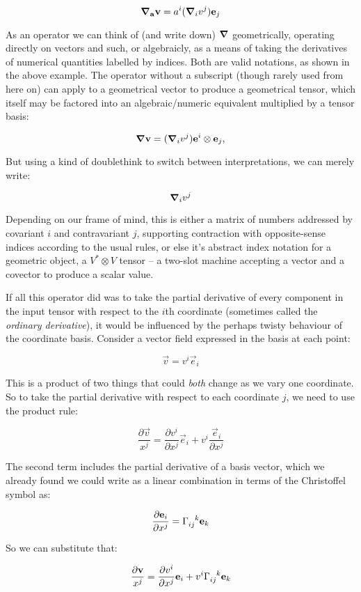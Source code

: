 $$
\grad_{\mathbf{a}} \mathbf{v} = a^i (\grad_i v^j) \mathbf{e}_j
$$

As an operator we can think of (and write down) $\grad$ geometrically, operating directly on vectors and such, or algebraicly, as a means of taking the derivatives of numerical quantities labelled by indices. Both are valid notations, as shown in the above example. The operator without a subscript (though rarely used from here on) can apply to a geometrical vector to produce a geometrical tensor, which itself may be factored into an algebraic/numeric equivalent multiplied by a tensor basis:

$$
\grad \mathbf{v} = (\grad_i v^j) \mathbf{e}^i \otimes \mathbf{e}_j,
$$

But using a kind of doublethink to switch between interpretations, we can merely write:

$$
\grad_i v^j
$$

Depending on our frame of mind, this is either a matrix of numbers addressed by covariant $i$ and contravariant $j$, supporting contraction with opposite-sense indices according to the usual rules, or else it's abstract index notation for a geometric object, a $V^* \otimes V$ tensor -- a two-slot machine accepting a vector and a covector to produce a scalar value.

If all this operator did was to take the partial derivative of every component in the input tensor with respect to the $i$th coordinate (sometimes called the \textit{ordinary derivative}), it would be influenced by the perhaps twisty behaviour of the coordinate basis. Consider a vector field expressed in the basis at each point:

$$
\vec{v} = v^i \vec{e}_i
$$

This is a product of two things that could \textit{both} change as we vary one coordinate. So to take the partial derivative with respect to each coordinate $j$, we need to use the product rule:

$$
\frac{\partial \vec{v}}{x^j} 
= \frac{\partial v^i}{\partial x^j} \vec{e}_i
+ v^i\frac{\vec{e}_i}{\partial x^j}
$$

The second term includes the partial derivative of a basis vector, which we already found we could write as a linear combination in terms of the Christoffel symbol as:

$$
\frac{\partial \vec{e}_i}{\partial x^j}
= \Gamma\indices{_i_j^k} \vec{e}_k
$$

So we can substitute that:

$$
\frac{\partial \vec{v}}{x^j} 
= \frac{\partial v^i}{\partial x^j} \vec{e}_i
+ v^i \Gamma\indices{_i_j^k} \vec{e}_k
$$

